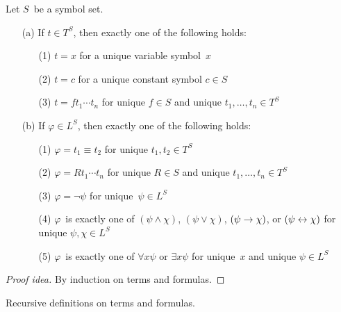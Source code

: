 \begin{thm}
Let \(S\)~be a symbol set.
\begin{enumerate}[itemsep=0pt]
\item[(a)] If \(t\in T^S\), then exactly one of the following holds:
\begin{enumerate}[itemsep=0pt]
\item[(1)] \(t=x\) for a unique variable symbol~\(x\)
\item[(2)] \(t=c\) for a unique constant symbol \(c\in S\)
\item[(3)] \(t=ft_1\cdots t_n\) for unique \(f\in S\) and unique \(t_1,\ldots,t_n\in T^S\)
\end{enumerate}
\item[(b)] If \(\varphi\in L^S\), then exactly one of the following holds:
\begin{enumerate}[itemsep=0pt]
\item[(1)] \(\varphi=t_1\equiv t_2\) for unique \(t_1,t_2\in T^S\)
\item[(2)] \(\varphi=Rt_1\cdots t_n\) for unique \(R\in S\) and unique \(t_1,\ldots,t_n\in T^S\)
\item[(3)] \(\varphi=\lnot\psi\) for unique~\(\psi\in L^S\)	
\item[(4)] \(\varphi\)~is exactly one of \((\psi\land\chi)\), \((\psi\lor\chi)\), \((\psi\rightarrow\chi)\), or \((\psi\leftrightarrow\chi)\) for unique \(\psi,\chi\in L^S\)
\item[(5)] \(\varphi\)~is exactly one of \(\forall x\psi\) or \(\exists x\psi\) for unique~\(x\) and unique \(\psi\in L^S\)
\end{enumerate}
\end{enumerate}
\end{thm}
\begin{proof}[Proof idea]
By induction on terms and formulas.
\end{proof}
\begin{app}
Recursive definitions on terms and formulas.
\end{app}